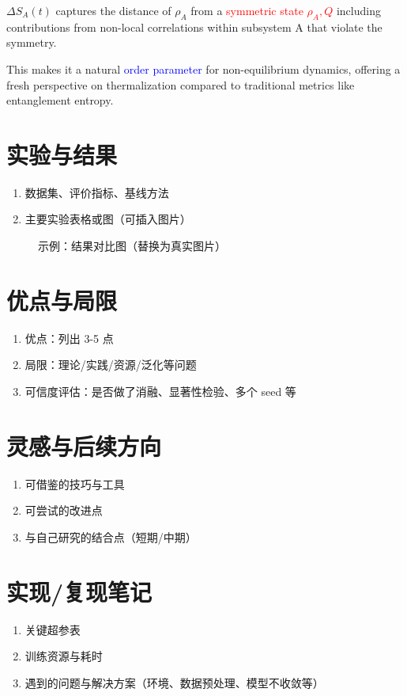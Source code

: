 \documentclass[11pt,a4paper]{article}
\begin{document}
\begin{enumerate}
\begin{enumerate}
$\Delta S_A(t)$ captures the distance of $\rho_A$ from a \textcolor{red}{symmetric state $\rho_A,Q$} including contributions from non-local correlations within subsystem A that violate the symmetry.

This makes it a natural \textcolor{blue}{order parameter} for non-equilibrium dynamics, offering a fresh perspective on thermalization compared to traditional metrics like entanglement entropy.


\section{实验与结果}
\begin{enumerate}
    \item 数据集、评价指标、基线方法
    \item 主要实验表格或图（可插入图片）
\end{enumerate}

\begin{figure}[H]
    \centering
    \caption{示例：结果对比图（替换为真实图片）}
\end{figure}

\section{优点与局限}
\begin{enumerate}
    \item 优点：列出 3-5 点
    \item 局限：理论/实践/资源/泛化等问题
    \item 可信度评估：是否做了消融、显著性检验、多个 seed 等
\end{enumerate}

\section{灵感与后续方向}
\begin{enumerate}
    \item 可借鉴的技巧与工具
    \item 可尝试的改进点
    \item 与自己研究的结合点（短期/中期）
\end{enumerate}

\section{实现/复现笔记}
\begin{enumerate}
    \item 关键超参表
    \item 训练资源与耗时
    \item 遇到的问题与解决方案（环境、数据预处理、模型不收敛等）
\end{enumerate}


\end{enumerate}
\end{enumerate}
\end{document}
